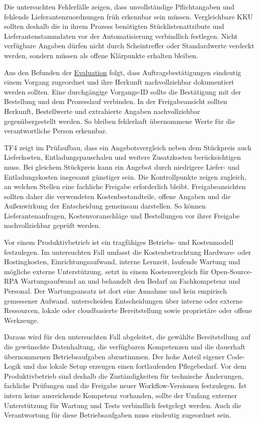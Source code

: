 \documentclass[a4paper,12pt]{article}
\begin{document}
Die untersuchten Fehlerfälle zeigen, dass unvollständige Pflichtangaben und fehlende Lieferantenzuordnungen früh erkennbar sein müssen. Vergleichbare KKU sollten deshalb die in ihrem Prozess benötigten Stücklistenattribute und Lieferantenstammdaten vor der Automatisierung verbindlich festlegen. Nicht verfügbare Angaben dürfen nicht durch Scheintreffer oder Standardwerte verdeckt werden, sondern müssen als offene Klärpunkte erhalten bleiben.

Aus den Befunden der \hyperref[sec:evaluation]{Evaluation} folgt, dass Auftragsbestätigungen eindeutig einem Vorgang zugeordnet und ihre Herkunft nachvollziehbar dokumentiert werden sollten. Eine durchgängige Vorgangs-ID sollte die Bestätigung mit der Bestellung und dem Prozesslauf verbinden. In der Freigabeansicht sollten Herkunft, Bestellwerte und extrahierte Angaben nachvollziehbar gegenübergestellt werden. So bleiben fehlerhaft übernommene Werte für die verantwortliche Person erkennbar.

TF4 zeigt im Prüfaufbau, dass ein Angebotsvergleich neben dem Stückpreis auch Lieferkosten, Entladungspauschalen und weitere Zusatzkosten berücksichtigen muss. Bei gleichem Stückpreis kann ein Angebot durch niedrigere Liefer- und Entladungskosten insgesamt günstiger sein. Die Kontrollpunkte zeigen zugleich, an welchen Stellen eine fachliche Freigabe erforderlich bleibt. Freigabeansichten sollten daher die verwendeten Kostenbestandteile, offene Angaben und die Außenwirkung der Entscheidung gemeinsam darstellen. So können Lieferantenanfragen, Kostenvoranschläge und Bestellungen vor ihrer Freigabe nachvollziehbar geprüft werden.

Vor einem Produktivbetrieb ist ein tragfähiges Betriebs- und Kostenmodell festzulegen. Im untersuchten Fall umfasst die Kostenbetrachtung Hardware- oder Hostingkosten, Einrichtungsaufwand, interne Lernzeit, laufende Wartung und mögliche externe Unterstützung. \Textcite{mostaquim_study_2022} setzt in einem Kostenvergleich für Open-Source-RPA Wartungsaufwand an und behandelt den Bedarf an Fachkompetenz und Personal. Der Wartungsansatz ist dort eine Annahme und kein empirisch gemessener Aufwand. \Textcite{asatiani_deciding_2023} unterscheiden Entscheidungen über interne oder externe Ressourcen, lokale oder cloudbasierte Bereitstellung sowie proprietäre oder offene Werkzeuge.

Daraus wird für den untersuchten Fall abgeleitet, die gewählte Bereitstellung auf die gewünschte Datenhaltung, die verfügbaren Kompetenzen und die dauerhaft übernommenen Betriebsaufgaben abzustimmen. Der hohe Anteil eigener Code-Logik und das lokale Setup erzeugen einen fortlaufenden Pflegebedarf. Vor dem Produktivbetrieb sind deshalb die Zuständigkeiten für technische Änderungen, fachliche Prüfungen und die Freigabe neuer Workflow-Versionen festzulegen. Ist intern keine ausreichende Kompetenz vorhanden, sollte der Umfang externer Unterstützung für Wartung und Tests verbindlich festgelegt werden. Auch die Verantwortung für diese Betriebsaufgaben muss eindeutig zugeordnet sein.
\end{document}
